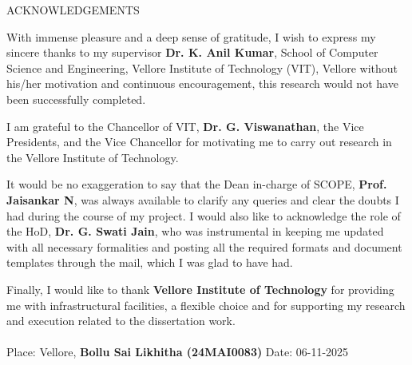 \centering
\begin{center}
\Large{ACKNOWLEDGEMENTS}
\end{center}
\vspace{1em}
\normalsize
\justifying
\begin{flushleft}
\justifying
\par With immense pleasure and a deep sense of gratitude, I wish to express my sincere thanks to my supervisor \textbf{Dr. K. Anil Kumar}, School of Computer Science and Engineering, Vellore Institute of Technology (VIT), Vellore without his/her motivation and continuous encouragement, this research would not have been successfully completed.	 

\par I am grateful to the Chancellor of VIT, \textbf{Dr. G. Viswanathan}, the Vice Presidents, and the Vice Chancellor for motivating me to carry out research in the Vellore Institute of Technology. 

\par It would be no exaggeration to say that the Dean in-charge of SCOPE, \textbf{Prof. Jaisankar N}, was always available to clarify any queries and clear the doubts I had during the course of my project.
I would also like to acknowledge the role of the HoD, \textbf{Dr. G. Swati Jain}, who was instrumental in keeping me updated with all necessary formalities and posting all the required formats and document templates through the mail, which I was glad to have had. 

\par Finally, I would like to thank \textbf{Vellore Institute of Technology} for providing me with infrastructural facilities, a flexible choice and for supporting my research and execution related to the dissertation work.
\end{flushleft}
\paragraph{} 
\vspace{3cm}

\begin{flushleft}
Place: Vellore, \hspace{6cm} \textbf{Bollu Sai Likhitha \; (24MAI0083)} \linebreak
Date: 06-11-2025 \hspace{8cm} \linebreak    
\end{flushleft}

\pagebreak
